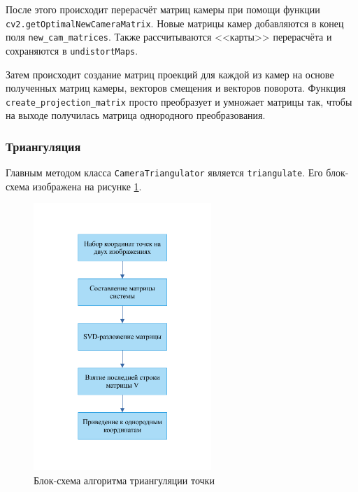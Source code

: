 \documentclass[14pt, a4paper]{extarticle}
\begin{document}
После этого происходит перерасчёт матриц камеры при помощи функции
\texttt{cv2.getOptimalNewCameraMatrix}. Новые матрицы камер добавляются в конец
поля \texttt{new\_cam\_matrices}. Также рассчитываются <<карты>> перерасчёта и
сохраняются в \texttt{undistortMaps}.

Затем происходит создание матриц проекций для каждой из камер на основе
полученных матриц камеры, векторов смещения и векторов поворота.
Функция \texttt{create\_projection\_matrix} просто преобразует и умножает
матрицы так, чтобы на выходе получилась матрица однородного преобразования.

\subsubsection{Триангуляция}
Главным методом класса \texttt{CameraTriangulator} является \texttt{triangulate}.
Его блок-схема изображена на рисунке \ref{fig:triangulation_scheme}.
\begin{figure}[h!]
  \begin{center}
    \includegraphics[width=0.6\textwidth]{images/block-schemes/triangulation_scheme.png}
  \end{center}
  \caption{Блок-схема алгоритма триангуляции точки}\label{fig:triangulation_scheme}
\end{figure}
\end{document}
